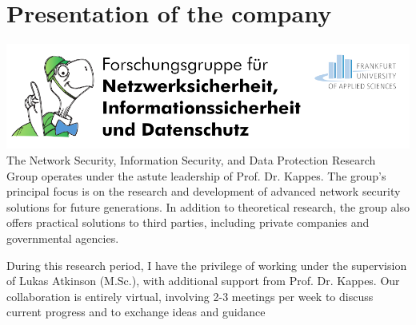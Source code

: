 \chapter{\centering Presentation of the company}

\includegraphics[width=\textwidth]{./images/research_group_logo.png} \\

The Network Security, Information Security, and Data Protection Research Group 
operates under the astute leadership of Prof. Dr. Kappes. The group's principal 
focus is on the research and development of advanced network security solutions 
for future generations. In addition to theoretical research, the group also offers
practical solutions to third parties, including private companies and governmental agencies.

During this research period, I have the privilege of working under the supervision 
of Lukas Atkinson (M.Sc.), with additional support from Prof. Dr. Kappes. Our 
collaboration is entirely virtual, involving 2-3 meetings per week to discuss 
current progress and to exchange ideas and guidance
